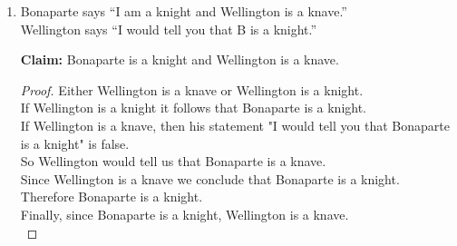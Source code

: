 \begin{enumerate}
\begin{enumerate}
\item Bonaparte says ``I am a knight and Wellington is a knave.''\\
Wellington says ``I would tell you that B is a knight.''

\textbf{Claim:} Bonaparte is a knight and Wellington is a knave.

\begin{proof}
    Either Wellington is a knave or Wellington is a knight.\\
    If Wellington is a knight it follows that Bonaparte is a knight.\\
    If Wellington is a knave, then his statement "I would tell you that Bonaparte is a knight" is false. \\
    So Wellington would tell us that Bonaparte is a knave. \\
    Since Wellington is a knave we conclude that Bonaparte is a knight.\\
    Therefore Bonaparte is a knight.\\
    Finally, since Bonaparte is a knight, Wellington is a knave. \\
\end{proof}

\end{enumerate}

\end{enumerate}
